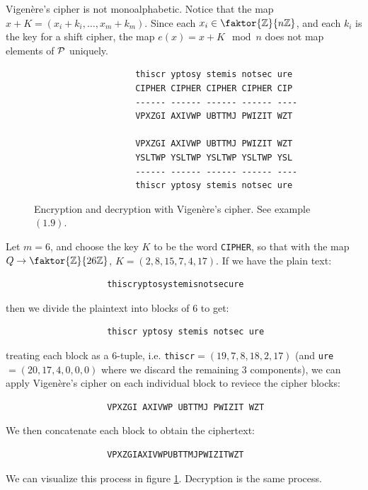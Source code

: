 \begin{example}
    Vigen\`ere's cipher is not monoalphabetic. Notice that the map $x+K
    =(x_i+k_i, \dots, x_m+k_m)$. Since each $x_i \in \faktor{\Z}{n\Z}$, and each
    $k_i$ is the key for a shift cipher, the map  $e(x)=x+K \mod{n}$ does not
    map elements of $\mathcal{P}$ uniquely.
\end{example}

\begin{figure}
    \centering
    \begin{verbatim}
                    thiscr yptosy stemis notsec ure
                    CIPHER CIPHER CIPHER CIPHER CIP
                    ------ ------ ------ ------ ----
                    VPXZGI AXIVWP UBTTMJ PWIZIT WZT

                    VPXZGI AXIVWP UBTTMJ PWIZIT WZT
                    YSLTWP YSLTWP YSLTWP YSLTWP YSL
                    ------ ------ ------ ------ ----
                    thiscr yptosy stemis notsec ure
    \end{verbatim}
    \caption{Encryption and decryption with Vigen\`ere's cipher. See example
    $(1.9)$.}
    \label{fig_1.3}
\end{figure}

\begin{example}
    Let $m=6$, and choose the key $K$ to be the word \lstinline {CIPHER}, so
    that with the map $Q \rightarrow \faktor{\Z}{26\Z}$, $K=(2,8,15,7,4,17)$. If
    we have the plain text:
         \begin{verbatim}
                    thiscryptosystemisnotsecure
        \end{verbatim}
    then we divide the plaintext into blocks of $6$ to get:
         \begin{verbatim}
                    thiscr yptosy stemis notsec ure
        \end{verbatim}
    treating each block as a $6$-tuple, i.e.
    \lstinline{thiscr}$=(19,7,8,18,2,17)$ (and \lstinline{ure}$=(20,17,4,0,0,0)$
    where we discard the remaining $3$ components), we can apply Vigen\`ere's
    cipher on each individual block to reviece the cipher blocks:
         \begin{verbatim}
                    VPXZGI AXIVWP UBTTMJ PWIZIT WZT
        \end{verbatim}
    We then concatenate each block to obtain the ciphertext:
         \begin{verbatim}
                    VPXZGIAXIVWPUBTTMJPWIZITWZT
        \end{verbatim}
    We can visualize this process in figure \ref{fig_1.3}. Decryption is the
    same process.
\end{example}


